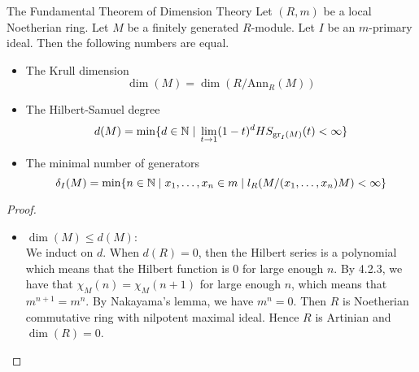\documentclass[a4paper]{article}
\begin{document}
\begin{thm}{The Fundamental Theorem of Dimension Theory}{} Let $(R,m)$ be a local Noetherian ring. Let $M$ be a finitely generated $R$-module. Let $I$ be an $m$-primary ideal. Then the following numbers are equal. 
\begin{itemize}
\item The Krull dimension $$\dim(M)=\dim(R/\text{Ann}_R(M))$$
\item The Hilbert-Samuel degree $$d(M)=\min\{d\in\mathbb{N}\;|\;\lim_{t\to 1}(1-t)^dHS_{\text{gr}_I(M)}(t)<\infty\}$$
\item The minimal number of generators $$\delta_I(M)=\min\{n\in\mathbb{N}\;|\;x_1,\dots,x_n\in m\;|\;l_R(M/(x_1,\dots,x_n)M)<\infty\}$$
\end{itemize} 
\begin{proof}
\begin{itemize}
\item $\dim(M)\leq d(M)$: \\
We induct on $d$. When $d(R)=0$, then the Hilbert series is a polynomial which means that the Hilbert function is $0$ for large enough $n$. By 4.2.3, we have that $\chi_M(n)=\chi_M(n+1)$ for large enough $n$, which means that $m^{n+1}=m^n$. By Nakayama's lemma, we have $m^n=0$. Then $R$ is Noetherian commutative ring with nilpotent maximal ideal. Hence $R$ is Artinian and $\dim(R)=0$. \\


\end{itemize}
\end{proof}
\end{thm}
\end{document}
